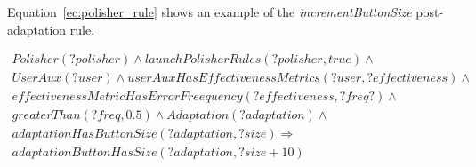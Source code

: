 Equation~\ref{ec:polisher_rule} shows an example of the \textit{incrementButtonSize} 
post-adaptation rule.

\footnotesize
\begin{equation} \label{ec:polisher_rule}
  \begin{align*} 
  Polisher(?polisher) ∧ launchPolisherRules(?polisher, true) ∧\\
  UserAux(?user) ∧ userAuxHasEffectivenessMetrics(?user, ?effectiveness) ∧ \\
  effectivenessMetricHasErrorFreequency(?effectiveness, ?freq?) ∧\\
  greaterThan(?freq, 0.5) ∧ Adaptation(?adaptation) ∧\\
  adaptationHasButtonSize(?adaptation, ?size)
  \Rightarrow \\
  adaptationButtonHasSize(?adaptation, ?size + 10)
  \end{align*}
\end{equation}
\normalsize
